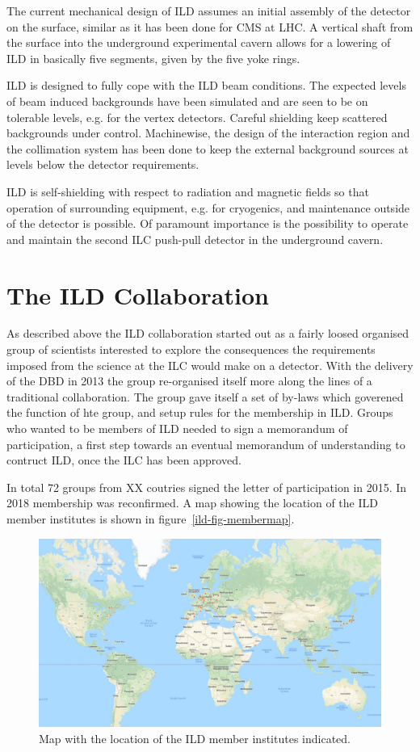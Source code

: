 \documentclass[%
 amsmath,amssymb,
 aps,
]{revtex4-1}
\begin{document}
The current mechanical design of ILD assumes an initial assembly of the detector on the surface, similar as it has been done for CMS at LHC. A vertical shaft from the surface into the underground experimental cavern allows for a lowering of ILD in basically five segments, given by the five yoke rings.

ILD is designed to fully cope with the ILD beam conditions. The expected levels of beam induced backgrounds have been simulated and are seen to be on tolerable levels, e.g. for the vertex detectors. Careful shielding keep scattered backgrounds under control. Machinewise, the design of the interaction region and the collimation system has been done to keep the external background sources at levels below the detector requirements.

ILD is self-shielding with respect to radiation and magnetic fields so that operation of surrounding equipment, e.g. for cryogenics, and maintenance outside of the detector is possible. Of paramount importance is the possibility to operate and maintain the second ILC push-pull detector in the underground cavern.

\section{The ILD Collaboration}
As described above the ILD collaboration started out as a fairly loosed organised group of scientists interested to explore the consequences the requirements imposed from the science at the ILC would make on a detector. With the delivery of the DBD in 2013 the group re-organised itself more along the lines of a traditional collaboration. The group gave itself a set of by-laws which goverened the function of hte group, and setup rules for the membership in ILD. Groups who wanted to be members of ILD needed to sign a memorandum of participation, a first step towards an eventual memorandum of understanding to contruct ILD, once the ILC has been approved. 

In total 72 groups from XX coutries signed the letter of participation in 2015. In 2018 membership was reconfirmed. A map showing the location of the ILD member institutes is shown in figure~\ref{ild-fig-membermap}.

\begin{figure}
    \centering
    \includegraphics[width=0.6\hsize]{figures/ILD_members_map.pdf}
    \caption{Map with the location of the ILD member institutes indicated.}
    \label{fig:my_label}
\end{figure}
\end{document}
